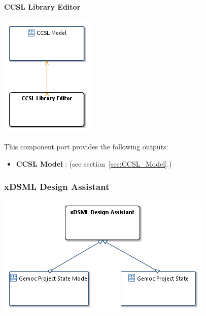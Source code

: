\documentclass{gemoc} %
\begin{document}
\paragraph{CCSL Library Editor}
\label{sec:CCSL_Library_Editor}


\begin{center}
\includegraphics*[trim=0.0cm 0.0cm 0cm 0.0cm, clip=true]{../images/generated/Generated_CCSL_Library_Editor.png}
\end{center}


This component port provides the following outputs:
\begin{itemize}
  \item \textbf{CCSL Model} :
(see section~\ref{sec:CCSL_Model}.)
\end{itemize}



\subsubsection{xDSML Design Assistant}
\label{sec:xDSML_Design_Assistant}
\begin{center}
\includegraphics*[trim=0.0cm 0.0cm 0cm 0.0cm, clip=true]{../images/generated/Generated_xDSML_Design_Assistant.png}
\end{center}
\end{document}

